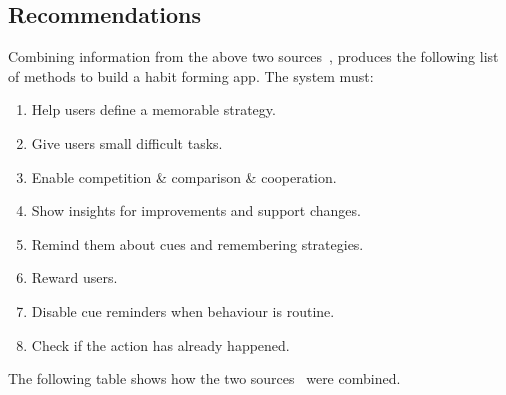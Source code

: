 \subsection{Recommendations} \label{recommendations}
Combining information from the above two sources~\cite{thesis_kathy, article_taxonomy_motivational_affordances_meaningful}, produces the following list of methods to build a habit forming app.\newline
\newline
The system must:

\begin{enumerate}
    \item Help users define a memorable strategy.
    \item Give users small difficult tasks.
    \item Enable competition \& comparison \& cooperation.
    \item Show insights for improvements and support changes.
    \item Remind them about cues and remembering strategies.
    \item Reward users.
    \item Disable cue reminders when behaviour is routine.
    \item Check if the action has already happened.
\end{enumerate}

The following table shows how the two sources~\cite{thesis_kathy, article_taxonomy_motivational_affordances_meaningful} were combined.


